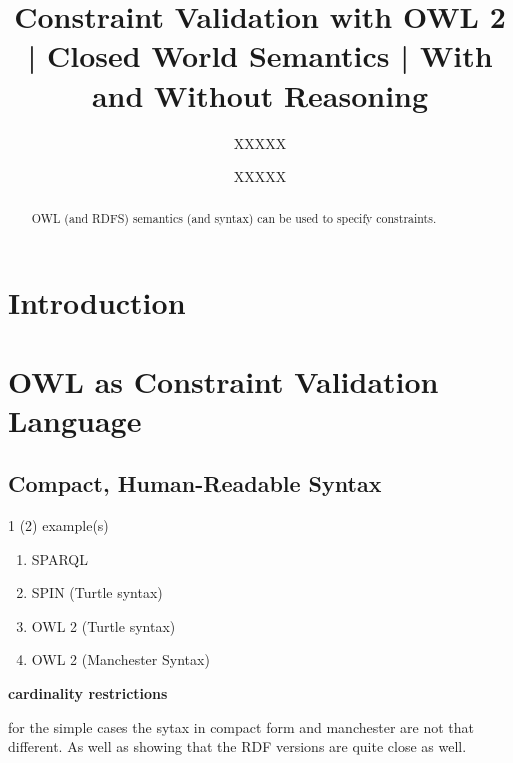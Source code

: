 \documentclass{llncs}
\begin{document}
%
%
\title{Constraint Validation with OWL 2 | Closed World Semantics | With and Without Reasoning}
%
%
\author{XXXXX \and XXXXX}
%
%

\maketitle              %

\begin{abstract}
OWL (and RDFS) semantics (and syntax) can be used to specify constraints.  

\end{abstract}
%

\section{Introduction}

\section{OWL as Constraint Validation Language}

\subsection{Compact, Human-Readable Syntax}

1 (2) example(s)

\begin{enumerate}
	\item SPARQL
	\item SPIN (Turtle syntax)
	\item OWL 2 (Turtle syntax)
	\item OWL 2 (Manchester Syntax)
\end{enumerate}


\textbf{cardinality restrictions}

for the simple cases the sytax in compact form and manchester are not that different. 
As well as showing that the RDF versions are quite close as well.
\end{document}
